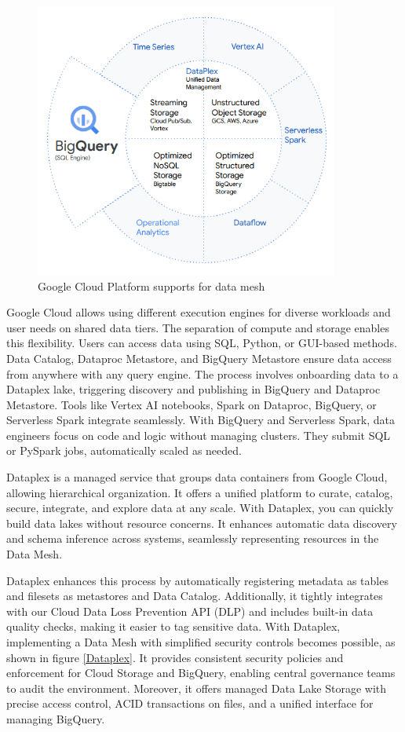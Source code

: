 \documentclass[12pt, a4paper]{book}
\begin{document}
\begin{figure}[h]
	\begin{framed}
		\centering
		\includegraphics[width=10cm]{GCPDataMesh.png}
		\caption{Google Cloud Platform supports for data mesh}
		\label{GCPDataMesh}
	\end{framed}
\end{figure}

Google Cloud allows using different execution engines for diverse workloads and user needs on shared data tiers. The separation of compute and storage enables this flexibility. Users can access data using SQL, Python, or GUI-based methods. Data Catalog, Dataproc Metastore, and BigQuery Metastore ensure data access from anywhere with any query engine. The process involves onboarding data to a Dataplex lake, triggering discovery and publishing in BigQuery and Dataproc Metastore. Tools like Vertex AI notebooks, Spark on Dataproc, BigQuery, or Serverless Spark integrate seamlessly. With BigQuery and Serverless Spark, data engineers focus on code and logic without managing clusters. They submit SQL or PySpark jobs, automatically scaled as needed.

Dataplex is a managed service that groups data containers from Google Cloud, allowing hierarchical organization. It offers a unified platform to curate, catalog, secure, integrate, and explore data at any scale. With Dataplex, you can quickly build data lakes without resource concerns. It enhances automatic data discovery and schema inference across systems, seamlessly representing resources in the Data Mesh.

Dataplex enhances this process by automatically registering metadata as tables and filesets as metastores and Data Catalog. Additionally, it tightly integrates with our Cloud Data Loss Prevention API (DLP) and includes built-in data quality checks, making it easier to tag sensitive data. With Dataplex, implementing a Data Mesh with simplified security controls becomes possible, as shown in figure \ref{Dataplex}. It provides consistent security policies and enforcement for Cloud Storage and BigQuery, enabling central governance teams to audit the environment. Moreover, it offers managed Data Lake Storage with precise access control, ACID transactions on files, and a unified interface for managing BigQuery.
\end{document}
